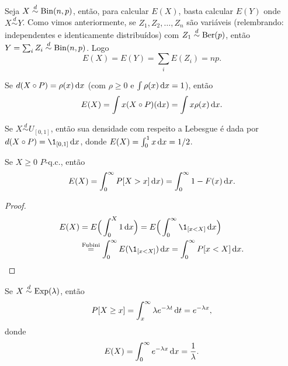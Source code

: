 \begin{example}
  Seja $X \overset{d}\sim \operatorname{Bin}(n,p)$, então, para calcular $E(X)$, basta calcular $E(Y)$ onde $X \overset{d}\sim Y$.
  Como vimos anteriormente, se $Z_1, Z_2, \dots, Z_n$ são variáveis \iid (relembrando: independentes e identicamente distribuídos) com $Z_1 \overset{d}\sim \operatorname{Ber}(p)$, então $Y = \sum_i Z_i \overset{d}\sim \operatorname{Bin}(n,p)$.
  Logo
  \begin{equation}
    E(X) = E(Y) = \sum_i E(Z_i) = n p.
  \end{equation}
\end{example}

Se $d(X \circ P) = \rho(x) \mathop{}\!\mathrm{d} x$ (com $\rho \geq 0$ e $\int \rho(x) \mathop{}\!\mathrm{d} x = 1$), então
\begin{equation}
  E(X) = \int x (X \circ P)(\mathop{}\!\mathrm{d} x) = \int x \rho(x) \mathop{}\!\mathrm{d} x.
\end{equation}

\begin{example}
  Se $X \overset{d}\sim U_{[0,1]}$, então sua densidade com respeito a Lebesgue é dada por $d(X \circ P) = \1_{[0,1]} \d x$, donde $E(X) = \int_0^1 x \mathop{}\!\mathrm{d} x = 1/2$.
\end{example}

\begin{proposition}
  \label{p:espera_acumulada}
  Se $X \geq 0$ $P$-q.c., então
  \begin{equation}
    E(X) = \int_0^\infty P[X > x] \mathop{}\!\mathrm{d} x) = \int_0^\infty 1 - F(x) \mathop{}\!\mathrm{d} x.
  \end{equation}
\end{proposition}

\begin{proof}
  \begin{equation}
    \begin{split}
      E(X) & = E \Big( \int_0^X 1 \d x \Big) = E \Big( \int_0^\infty \1_{[x < X]} \d x \Big)\\
      & \overset{\text{Fubini}}= \int_0^\infty E(\1_{[x < X]}) \d x = \int_0^\infty P[x < X] \d x.
    \end{split}
  \end{equation}
\end{proof}

\begin{example}
  Se $X \overset{d}\sim \operatorname{Exp}(\lambda)$, então
  \begin{equation}
    P[X \geq x] = \int_x^\infty \lambda e^{-\lambda t} \mathop{}\!\mathrm{d} t = e^{-\lambda x},
  \end{equation}
  donde
  \begin{equation}
    E(X) = \int_0^\infty e^{-\lambda x} \mathop{}\!\mathrm{d} x = \frac{1}{\lambda}.
  \end{equation}
\end{example}

